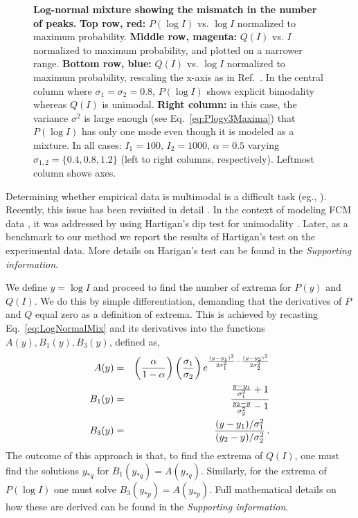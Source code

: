 \documentclass[11pt,a4paper,draft]{article}
\begin{document}
\begin{figure}[!ht]
 \centering
  \caption{\textbf{Log-normal mixture showing the mismatch in the number of peaks.} \textbf{Top row, red:} $P(\log I)$ vs. $\log I$ normalized to maximum probability. \textbf{Middle row, magenta:} $Q(I)$ vs. $I$ normalized to maximum probability, and plotted on a narrower range. \textbf{Bottom row, blue:} $Q(I)$ vs. $\log I$ normalized to maximum probability, rescaling the x-axis as in Ref.~\cite{Novo2008}. In the central column where $\sigma_1=\sigma_2=0.8$, $P(\log I)$ shows explicit bimodality whereas $Q(I)$ is unimodal. \textbf{Right column:} in this case, the variance $\sigma^2$ is large enough (see Eq.~\ref{eq:Plogy3Maxima}) that $P(\log I)$ has only one mode even though it is modeled as a mixture. In all cases: $I_1=100,\,I_2=1000,\,\alpha=0.5$ varying $\sigma_{1,2}=\{0.4,0.8,1.2\}$ (left to right columns, respectively). Leftmost column shows axes. }
  \label{fig:PlotsLinearLog}
\end{figure}

Determining whether empirical data is multimodal is a difficult task (eg., \cite{Silverman1981}). Recently, this issue has been revisited in detail \cite{Johnsson2017}. In the context of modeling FCM data \cite{Das2009}, it was addressed by using Hartigan's dip test for unimodality \cite{Hartigan1985}. Later, as a benchmark to our method we report the results of Hartigan's test on the experimental data. More details on Harigan's test can be found in the \emph{Supporting information}.
\smallskip

We define $y=\log I$ and proceed to find the number of extrema for $P(y)$ and $Q(I)$. We do this by simple differentiation, demanding that the derivatives of $P$ and $Q$ equal zero as a definition of extrema. This is achieved by recasting Eq.~\ref{eq:LogNormalMix} and its derivatives into the functions $A(y),B_1(y),B_3(y)$, defined as,
\begin{eqnarray} 
\label{eq:extrema}
A(y) &=& \left(\frac{\alpha}{1-\alpha}\right)\left(\frac{\sigma_1}{\sigma_2}\right) e^{\frac{(y-y_1)^2}{2 \sigma_1^2}-\frac{(y-y_2)^2}{2 \sigma_2^2}}  \\ \nonumber
B_1(y) &=& \frac{\frac{y-y_1}{\sigma_1^2}+1}{\frac{y_2-y}{\sigma_2^2}-1} \\ \nonumber
B_3(y) &=& \frac{(y-y_1)/\sigma_1^2}{(y_2-y)/\sigma_2^2}\,.
\end{eqnarray}
The outcome of this approach is that, to find the extrema of $Q(I)$, one must find the solutions $y_{*q}$ for $B_1(y_{*q})=A(y_{*q})$. Similarly, for the extrema of $P(\log I)$ one must solve $B_3(y_{*p})=A(y_{*p})$. Full mathematical details on how these are derived can be found in the \emph{Supporting information}. 
\end{document}
